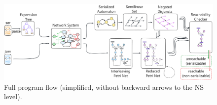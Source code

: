 \begin{figure}[!htbp]
	\centering
	\includegraphics[width=1.0\textwidth]{plots/full_program_flow.pdf}
	\caption{Full program flow 
	(simplified, without backward arrows 
	to the NS level).}
	\label{fig:full_program_flow}
\end{figure}





